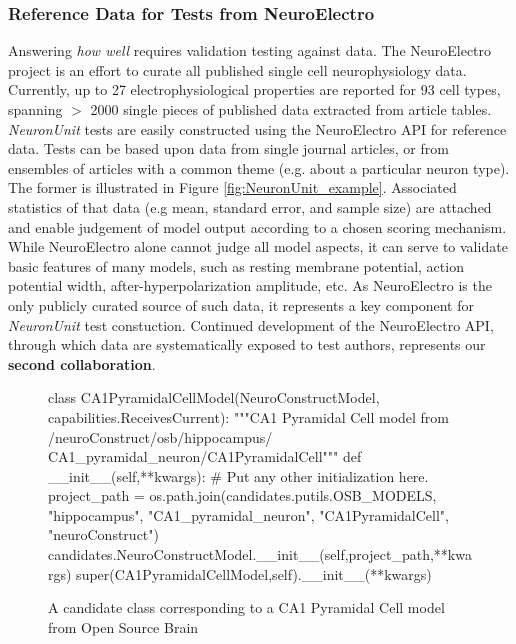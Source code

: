 \documentclass[11pt,letterpaper]{article}
\begin{document}
\subsubsection{Reference Data for Tests from NeuroElectro}
Answering \textit{how well} requires validation testing against data. The NeuroElectro project\cite{neuroelectro_url} is an effort to curate all published single cell neurophysiology data\cite{tripathy_neuroelectro:_2012}.  Currently, up to 27 electrophysiological properties are reported for 93 cell types, spanning $>$ 2000 single pieces of published data extracted from article tables.  \textit{NeuronUnit} tests are easily constructed using the NeuroElectro API for reference data. Tests can be based upon data from single journal articles, or from ensembles of articles with a common theme (e.g. about a particular neuron type).  The former is illustrated in Figure \ref{fig:NeuronUnit_example}.  Associated statistics of that data (e.g mean, standard error, and sample size) are attached and enable judgement of model output according to a chosen scoring mechanism. While NeuroElectro alone cannot judge all model aspects, it can serve to validate basic features of many models, such as resting membrane potential, action potential width, after-hyperpolarization amplitude, etc.  As NeuroElectro is the only publicly curated source of such data, it represents a key component for \textit{NeuronUnit} test constuction.  Continued development of the NeuroElectro API, through which data are systematically exposed to test authors, represents our \textbf{second collaboration}\cite{neuroelectro_dev_url}.  

\begin{figure}
\label{fig:ca1_model}
\begin{python}
class CA1PyramidalCellModel(NeuroConstructModel,
				            capabilities.ReceivesCurrent):
	"""CA1 Pyramidal Cell model from /neuroConstruct/osb/hippocampus/
	CA1_pyramidal_neuron/CA1PyramidalCell"""
	def __init__(self,**kwargs):
		# Put any other initialization here.
		project_path = os.path.join(candidates.putils.OSB_MODELS,
									"hippocampus",
									"CA1_pyramidal_neuron",
									"CA1PyramidalCell",
									"neuroConstruct")
		candidates.NeuroConstructModel.__init__(self,project_path,**kwargs)
		super(CA1PyramidalCellModel,self).__init__(**kwargs)
\end{python}
\vspace{-5px}
\caption{A candidate class corresponding to a CA1 Pyramidal Cell model from Open Source Brain}
\vspace{-10px}
\end{figure}
\end{document}
